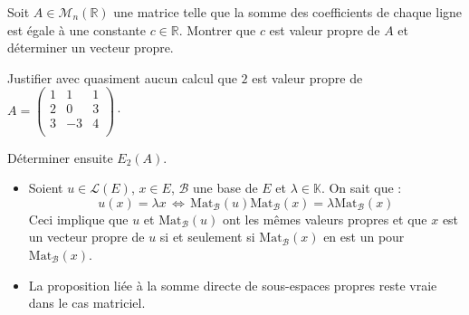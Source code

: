 \documentclass[french,11pt,twoside]{VcCours}
\begin{document}
\begin{Exemple}{} Soit $A \in \mathcal{M}_n(\mathbb{R})$ une matrice telle que la somme des coefficients de chaque ligne est égale à une constante $c \in \mathbb{R}$. Montrer que $c$ est valeur propre de $A$ et déterminer un vecteur propre.

\vspace{5cm}

\end{Exemple}

\begin{ApplicationDirecte}{} Justifier avec quasiment aucun calcul que $2$ est valeur propre de $A= \begin{pmatrix}
1& 1 & 1 \\
2  & 0 & 3 \\
3 & -3 & 4 \\
\end{pmatrix}\cdot$

Déterminer ensuite $E_2(A)$.
\end{ApplicationDirecte}
%

\begin{Remarques}{}
\begin{itemize} 
\item Soient $u \in \mathcal{L}(E)$, $x \in E$, $\mathcal{B}$ une base de $E$ et $\lambda \in \mathbb{K}$. On sait que :
$$ u(x) = \lambda x \, \Longleftrightarrow \, \textrm{Mat}_{\mathcal{B}}(u) \textrm{Mat}_{\mathcal{B}}(x) = \lambda \textrm{Mat}_{\mathcal{B}}(x) $$
Ceci implique que $u$ et $\textrm{Mat}_{\mathcal{B}}(u)$ ont les mêmes valeurs propres et que $x$ est un vecteur propre de $u$ si et seulement si $\textrm{Mat}_{\mathcal{B}}(x)$ en est un pour $\textrm{Mat}_{\mathcal{B}}(x)$.
\item La proposition liée à la somme directe de sous-espaces propres reste vraie dans le cas matriciel.
\end{itemize}
\end{Remarques}

%
%
%
\end{document}
